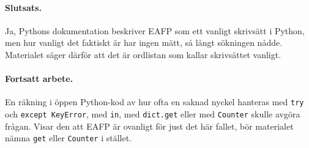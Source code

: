 \paragraph{Slutsats.}  Ja, Pythons dokumentation beskriver EAFP som ett
vanligt skrivsätt i Python\autocite{PythonGlossary}, men hur vanligt det
faktiskt är har ingen mätt, så långt sökningen nådde.  Materialet säger
därför att det är ordlistan som kallar skrivsättet vanligt.

\paragraph{Fortsatt arbete.}  En räkning i öppen Python-kod av hur ofta
en saknad nyckel hanteras med \texttt{try} och
\texttt{except KeyError}, med \texttt{in}, med
\texttt{dict.get} eller med \texttt{Counter}
skulle avgöra frågan.  Visar den att EAFP är ovanligt för just det här
fallet, bör materialet nämna \texttt{get} eller
\texttt{Counter} i stället.
